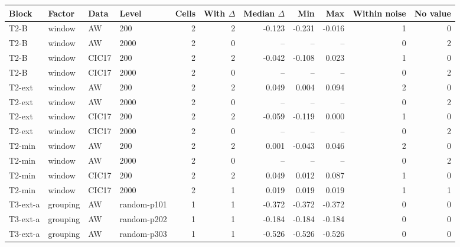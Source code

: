 \begin{table}[t]
  \centering
  \footnotesize
  \begin{tabular}{@{}llllrrrrrrr@{}}
  \toprule
  Block & Factor & Data & Level & Cells & With $\Delta$ & Median $\Delta$ & Min & Max & Within noise & No value \\
  \midrule
  T2-B & window & AW & 200 & 2 & 2 & -0.123 & -0.231 & -0.016 & 1 & 0 \\
  T2-B & window & AW & 2000 & 2 & 0 & -- & -- & -- & 0 & 2 \\
  T2-B & window & CIC17 & 200 & 2 & 2 & -0.042 & -0.108 & 0.023 & 1 & 0 \\
  T2-B & window & CIC17 & 2000 & 2 & 0 & -- & -- & -- & 0 & 2 \\
  T2-ext & window & AW & 200 & 2 & 2 & 0.049 & 0.004 & 0.094 & 2 & 0 \\
  T2-ext & window & AW & 2000 & 2 & 0 & -- & -- & -- & 0 & 2 \\
  T2-ext & window & CIC17 & 200 & 2 & 2 & -0.059 & -0.119 & 0.000 & 1 & 0 \\
  T2-ext & window & CIC17 & 2000 & 2 & 0 & -- & -- & -- & 0 & 2 \\
  T2-min & window & AW & 200 & 2 & 2 & 0.001 & -0.043 & 0.046 & 2 & 0 \\
  T2-min & window & AW & 2000 & 2 & 0 & -- & -- & -- & 0 & 2 \\
  T2-min & window & CIC17 & 200 & 2 & 2 & 0.049 & 0.012 & 0.087 & 1 & 0 \\
  T2-min & window & CIC17 & 2000 & 2 & 1 & 0.019 & 0.019 & 0.019 & 1 & 1 \\
  T3-ext-a & grouping & AW & random-p101 & 1 & 1 & -0.372 & -0.372 & -0.372 & 0 & 0 \\
  T3-ext-a & grouping & AW & random-p202 & 1 & 1 & -0.184 & -0.184 & -0.184 & 0 & 0 \\
  T3-ext-a & grouping & AW & random-p303 & 1 & 1 & -0.526 & -0.526 & -0.526 & 0 & 0 \\

\end{tabular}
\end{table}
